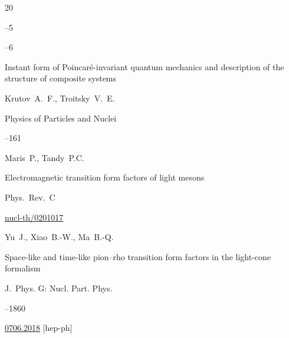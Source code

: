 \begin{thebibliography}{20}

--5

--6









\paper Instant form of Poincar\'e-invariant quantum mechanics and description of the structure of composite systems

\by Krutov~A.~F., Troitsky~V.~E.

\jour Physics of Particles and Nuclei




--161








\by Maris~P., Tandy~P.C.

\paper    Electromagnetic transition form factors of light mesons 

\jour Phys.~Rev.~C






\arxiv \href{http://arxiv.org/abs/nucl-th/0201017}{nucl-th/0201017}




\by Yu~J., Xiao~B.-W.,  Ma~B.-Q.

\paper  Space-like and time-like pion–rho transition form factors in the light-cone formalism 

\jour J.~Phys. G: Nucl. Part. Phys. 




--1860

\arxiv \href{http://arxiv.org/abs/0706.2018}{0706.2018} [hep-ph]





\end{thebibliography}
